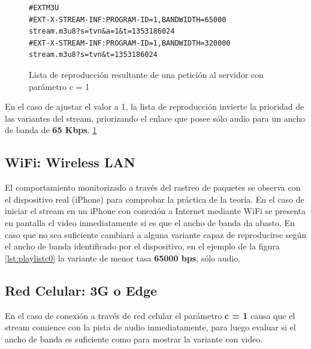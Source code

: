 \begin{figure}[H]
	\centering
\begin{lstlisting}
#EXTM3U
#EXT-X-STREAM-INF:PROGRAM-ID=1,BANDWIDTH=65000
stream.m3u8?s=tvn&a=1&t=1353186024
#EXT-X-STREAM-INF:PROGRAM-ID=1,BANDWIDTH=320000
stream.m3u8?s=tvn&t=1353186024
\end{lstlisting}
\caption{Lista de reproducción resultante de una petición al servidor con parámetro c = 1}
\label{lst:playlistc1}
\end{figure}

En el caso de ajustar el valor a 1, la lista de reproducción invierte la prioridad de las variantes del stream, priorizando el enlace que posee sólo audio para un ancho de banda de \textbf{65 Kbps}. \ref{lst:playlistc1}


  \subsection{WiFi: Wireless LAN}
  El comportamiento monitorizado a través del rastreo de paquetes se observa con el dispositivo real (iPhone) para comprobar la práctica de la teoría.
  En el caso de iniciar el stream en un iPhone con conexión a Internet mediante WiFi se presenta en pantalla el video inmediatamente si es que el ancho de banda da abasto. En caso que no sea suficiente cambiará a alguna variante capaz de reproducirse según el ancho de banda identificado por el dispositivo, en el ejemplo de la figura \ref{lst:playlistc0} la variante de menor tasa \textbf{65000 bps}, sólo audio.
  
  
  

  \subsection{Red Celular: 3G o Edge}
En el caso de conexión a través de red celular el parámetro \textbf{c = 1} causa que el stream comience con la pista de audio inmediatamente, para luego evaluar si el ancho de banda es suficiente como para mostrar la variante con video.

